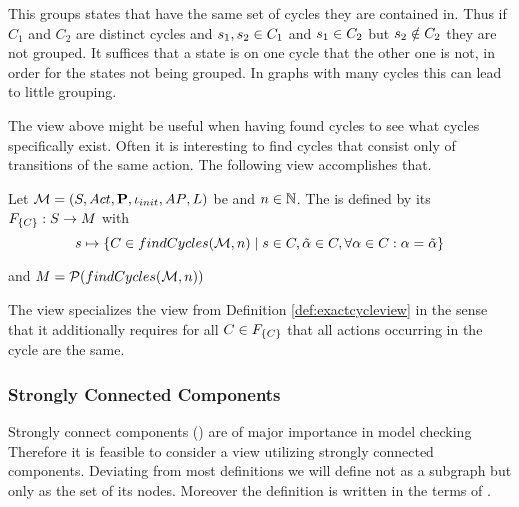 \documentclass[preview]{standalone}
\begin{document}
This \viewN groups states that have the same set of cycles they are contained in. Thus if $C_1$ and $C_2$ are distinct cycles and ${s}_1, {s}_2 \in {C}_1$ and ${s}_1 \in {C}_2$ but ${s}_2 \notin {C}_2$ they are not grouped. It suffices that a state is on one cycle that the other one is not, in order for the states not being grouped. In graphs with many cycles this can lead to little grouping.



The view above might be useful when having found cycles to see what cycles specifically exist. Often it is interesting to find cycles that consist only of transitions of the same action. The following view accomplishes that.

\begin{definition}
	Let ${{{\mathcal{M}}}} = {{({S}, {Act}, {\textbf{P}}, {\iota_{init}}, {AP}, {L})}}$ be \achgphN and $n \in {\mathbb{N}}$. The \viewN \viewexactcycle is defined by its \grpfctN ${{F_{\{{C}\}}}} : {S} \to {\ensuremath{{M}}}$ with
	\[
	{s} \mapsto \{{C} \in {findCycles}({{{\mathcal{M}}}}, n) \mid {s} \in {C}, \tilde{{\alpha}} \in {C}, \forall {\alpha} \in {C} : {\alpha} = \tilde{{\alpha}} \}
	\]
	
	and ${{M}} = {\mathcal{P}({findCycles}({{{\mathcal{M}}}}, n))}$
\end{definition}

The view specializes the view from Definition \ref{def:exactcycleview} in the sense that it additionally requires for all ${C} \in {\ensuremath{{F_{\{{C}\}}}}}$ that all actions occurring in the cycle are the same. 



\subsubsection{Strongly Connected Components}
Strongly connect components (\sccN) are of major importance in model checking 
Therefore it is feasible to consider a view utilizing strongly connected components. Deviating from most definitions we will define \sccN not as a subgraph but only as the set of its nodes. Moreover the definition is written in the terms of \achgphN.
\end{document}
